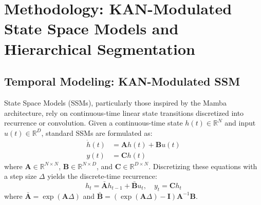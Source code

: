 \section{Methodology: KAN-Modulated State Space Models and Hierarchical Segmentation}

\subsection{Temporal Modeling: KAN-Modulated SSM}
\label{sec:kan_ssm}
State Space Models (SSMs), particularly those inspired by the Mamba architecture, rely on continuous-time linear state transitions discretized into recurrence or convolution. Given a continuous-time state $h(t) \in \mathbb{R}^N$ and input $u(t) \in \mathbb{R}^D$, standard SSMs are formulated as:
\begin{align}
    \dot{h}(t) &= \mathbf{A}h(t) + \mathbf{B}u(t) \\
    y(t) &= \mathbf{C}h(t)
\end{align}
where $\mathbf{A} \in \mathbb{R}^{N \times N}$, $\mathbf{B} \in \mathbb{R}^{N \times D}$, and $\mathbf{C} \in \mathbb{R}^{D \times N}$. Discretizing these equations with a step size $\Delta$ yields the discrete-time recurrence:
\begin{equation}
    h_t = \bar{\mathbf{A}}h_{t-1} + \bar{\mathbf{B}}u_t, \quad y_t = \mathbf{C}h_t
\end{equation}
where $\bar{\mathbf{A}} = \exp(\mathbf{A}\Delta)$ and $\bar{\mathbf{B}} = (\exp(\mathbf{A}\Delta) - \mathbf{I})\mathbf{A}^{-1}\mathbf{B}$.

